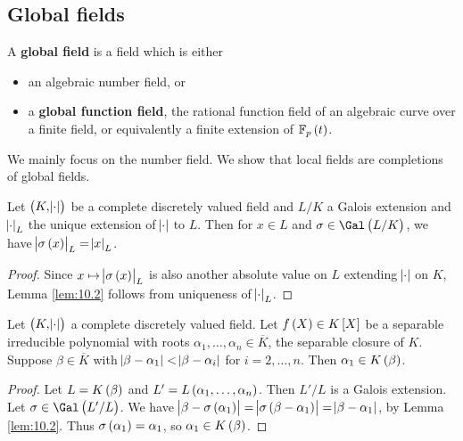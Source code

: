 \pagebreak

\subsection{Global fields}


\begin{definition}
A \textbf{global field} is a field which is either
\begin{itemize}
\item an algebraic number field, or
\item a \textbf{global function field}, the rational function field of an algebraic curve over a finite field, or equivalently a finite extension of $ \FF_p\br{t} $.
\end{itemize}
\end{definition}

We mainly focus on the number field. We show that local fields are completions of global fields.

\begin{lemma}
\label{lem:10.2}
Let $ \br{K, \abs{\cdot}} $ be a complete discretely valued field and $ L / K $ a Galois extension and $ \abs{\cdot}_L $ the unique extension of $ \abs{\cdot} $ to $ L $. Then for $ x \in L $ and $ \sigma \in \Gal\br{L / K} $, we have $ \abs{\sigma\br{x}}_L = \abs{x}_L $.
\end{lemma}

\begin{proof}
Since $ x \mapsto \abs{\sigma\br{x}}_L $ is also another absolute value on $ L $ extending $ \abs{\cdot} $ on $ K $, Lemma \ref{lem:10.2} follows from uniqueness of $ \abs{\cdot}_L $.
\end{proof}

\begin{lemma}
Let $ \br{K, \abs{\cdot}} $ a complete discretely valued field. Let $ f\br{X} \in K\sbr{X} $ be a separable irreducible polynomial with roots $ \alpha_1, \dots, \alpha_n \in \overline{K} $, the separable closure of $ K $. Suppose $ \beta \in \overline{K} $ with $ \abs{\beta - \alpha_1} < \abs{\beta - \alpha_i} $ for $ i = 2, \dots, n $. Then $ \alpha_1 \in K\br{\beta} $.
\end{lemma}

\begin{proof}
Let $ L = K\br{\beta} $ and $ L' = L\br{\alpha_1, \dots, \alpha_n} $. Then $ L' / L $ is a Galois extension. Let $ \sigma \in \Gal\br{L' / L} $. We have $ \abs{\beta - \sigma\br{\alpha_1}} = \abs{\sigma\br{\beta - \alpha_1}} = \abs{\beta - \alpha_1} $, by Lemma \ref{lem:10.2}. Thus $ \sigma\br{\alpha_1} = \alpha_1 $, so $ \alpha_1 \in K\br{\beta} $.
\end{proof}

